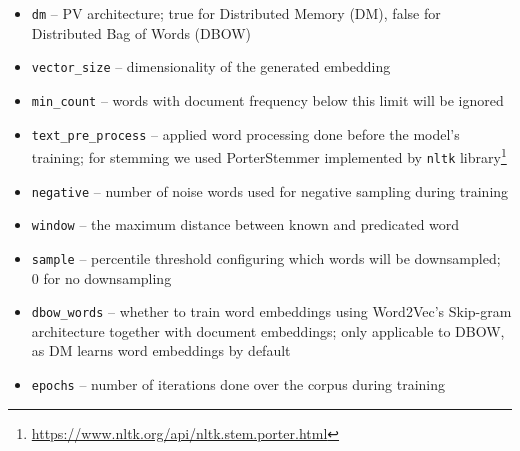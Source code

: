 \begin{itemize}

  \item \texttt{dm} --  PV architecture; true for Distributed Memory (DM),
    false for Distributed Bag of Words (DBOW)

  \item \texttt{vector\_size} -- dimensionality of the generated embedding

  \item \texttt{min\_count} -- words with document frequency below this limit
    will be ignored

  \item \texttt{text\_pre\_process} -- applied word processing done before the
    model's training; for stemming we used PorterStemmer implemented by
    \texttt{nltk}
    library\footnote{\url{https://www.nltk.org/api/nltk.stem.porter.html}}

  \item \texttt{negative} -- number of noise words used for negative sampling
    during training

  \item \texttt{window} -- the maximum distance between known and predicated
    word

  \item \texttt{sample} -- percentile threshold configuring which words will be
    downsampled; 0 for no downsampling


  \item \texttt{dbow\_words} -- whether to train word embeddings using
    Word2Vec's \citep{mikolov2013efficient} Skip-gram architecture together
    with document embeddings; only applicable to DBOW, as DM learns word
    embeddings by default

  \item \texttt{epochs} -- number of iterations done over the corpus during
    training

\end{itemize}


